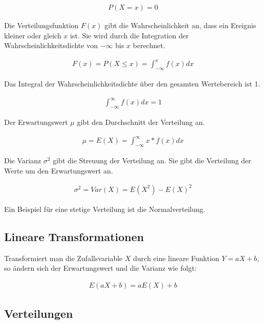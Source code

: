 \documentclass[12pt]{scrartcl}
\begin{document}
\begin{align*}
    P(X=x) = 0
\end{align*}

Die Verteilungsfunktion $F(x)$ gibt die Wahrscheinlichkeit an, dass ein Ereignis kleiner oder gleich $x$ ist.
Sie wird durch die Integration der Wahrscheinlichkeitsdichte von $-\infty$ bis $x$ berechnet.\par

\begin{align*}
    F(x) = P(X \leq x) = \int_{-\infty}^{x} f(x) dx
\end{align*}

Das Integral der Wahrscheinlichkeitsdichte über den gesamten Wertebereich ist 1.\par

\begin{align*}
    \int_{-\infty}^{\infty} f(x) dx = 1
\end{align*}

Der Erwartungswert $\mu$ gibt den Durchschnitt der Verteilung an.\par

\begin{align*}
    \mu = E(X) = \int_{-\infty}^{\infty} x * f(x) dx
\end{align*}

Die Varianz $\sigma^2$ gibt die Streuung der Verteilung an.
Sie gibt die Verteilung der Werte um den Erwartungswert an.
\par

\begin{align*}
    \sigma^2 = Var(X) = E(X^2) - E(X)^2
\end{align*}

Ein Beispiel für eine stetige Verteilung ist die Normalverteilung.

\subsection{Lineare Transformationen}

Transformiert man die Zufallsvariable $X$ durch eine lineare Funktion $Y = aX + b$, so ändern sich der Erwartungswert und die Varianz wie folgt:

\begin{align*}
    E(aX+b) = aE(X) + b
\end{align*}

\pagebreak

\subsection{Verteilungen}
\end{document}
